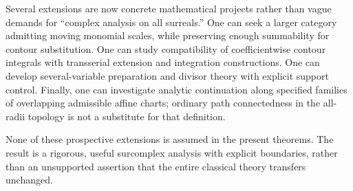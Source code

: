 \documentclass[11pt,oneside]{article}
\theoremstyle{definition}\newtheorem{definition}[theorem]{Definition}
\begin{document}
Several extensions are now concrete mathematical projects rather than vague demands for ``complex analysis on all surreals.'' One can seek a larger category admitting moving monomial scales, while preserving enough summability for contour substitution. One can study compatibility of coefficientwise contour integrals with transserial extension and integration constructions. One can develop several-variable preparation and divisor theory with explicit support control. Finally, one can investigate analytic continuation along specified families of overlapping admissible affine charts; ordinary path connectedness in the all-radii topology is not a substitute for that definition.

None of these prospective extensions is assumed in the present theorems. The result is a rigorous, useful surcomplex analysis with explicit boundaries, rather than an unsupported assertion that the entire classical theory transfers unchanged.

\appendix
\end{document}
